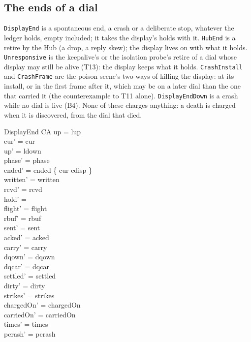 \documentclass[a4paper,10pt,fleqn]{article}
\begin{document}
\subsection{The ends of a dial}

\texttt{DisplayEnd} is a spontaneous end, a crash or a deliberate stop, whatever
the ledger holds, empty included; it takes the display's holds with it.
\texttt{HubEnd} is a retire by the Hub (a drop, a reply skew); the
display lives on with what it holds.  \texttt{Unresponsive} is the keepalive's or
the isolation probe's retire of a dial whose display may still be alive (T13): the
display keeps what it holds.  \texttt{CrashInstall} and
\texttt{CrashFrame} are the poison scene's two ways of killing the display: at
its install, or in the first frame after it, which may be on a later dial than
the one that carried it (the counterexample to T11 alone).
\texttt{DisplayEndDown} is a crash while no dial is live (B4).  None of these
charges anything: a death is charged when it is discovered, from the dial that
died.

\begin{schema}{DisplayEnd}
  \Delta CA
\where
  up = lup \\
  cur' = cur \\
  up' = ldown \\
  phase' = phase \\
  ended' = ended \oplus \{ cur \mapsto edisp \} \\
  written' = written \\
  rcvd' = rcvd \\
  hold' = \emptyset \\
  flight' = flight \\
  rbuf' = rbuf \\
  sent' = sent \\
  acked' = acked \\
  carry' = carry \\
  dqown' = dqown \\
  dqcar' = dqcar \\
  settled' = settled \\
  dirty' = dirty \\
  strikes' = strikes \\
  chargedOn' = chargedOn \\
  carriedOn' = carriedOn \\
  times' = times \\
  pcrash' = pcrash
\end{schema}
\end{document}
